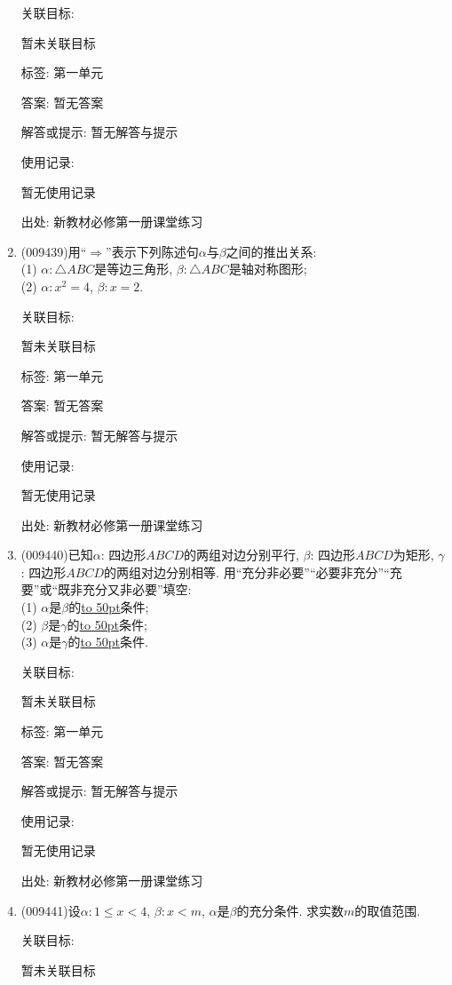 \documentclass[10pt,a4paper]{article}
\newcommand{\blank}[1]{\underline{\hbox to #1pt{}}}
\begin{document}
\begin{enumerate}[1.]
关联目标:

暂未关联目标



标签: 第一单元

答案: 暂无答案

解答或提示: 暂无解答与提示

使用记录:

暂无使用记录


出处: 新教材必修第一册课堂练习
\item { (009439)}用``$\Rightarrow$''表示下列陈述句$\alpha$与$\beta$之间的推出关系:\\
(1) $\alpha: \triangle ABC$是等边三角形, $\beta: \triangle ABC$是轴对称图形;\\
(2) $\alpha: x^2=4$, $\beta: x=2$.


关联目标:

暂未关联目标



标签: 第一单元

答案: 暂无答案

解答或提示: 暂无解答与提示

使用记录:

暂无使用记录


出处: 新教材必修第一册课堂练习
\item { (009440)}已知$\alpha$: 四边形$ABCD$的两组对边分别平行, $\beta$: 四边形$ABCD$为矩形, $\gamma$: 四边形$ABCD$的两组对边分别相等. 用``充分非必要''``必要非充分''``充要''或``既非充分又非必要''填空:\\
(1) $\alpha$是$\beta$的\blank{50}条件;\\
(2) $\beta$是$\gamma$的\blank{50}条件;\\
(3) $\alpha$是$\gamma$的\blank{50}条件.


关联目标:

暂未关联目标



标签: 第一单元

答案: 暂无答案

解答或提示: 暂无解答与提示

使用记录:

暂无使用记录


出处: 新教材必修第一册课堂练习
\item { (009441)}设$\alpha: 1\le x<4$, $\beta: x<m$, $\alpha$是$\beta$的充分条件. 求实数$m$的取值范围.


关联目标:

暂未关联目标




\end{enumerate}
\end{document}

